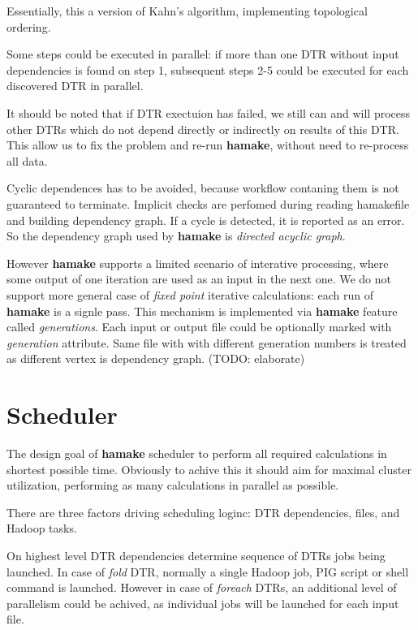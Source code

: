 \documentclass{article}
\begin{document}
Essentially, this a version of Kahn's
algorithm\cite{kahn1962topological}, implementing topological
ordering\cite{wiki:topsort}.

Some steps could be executed in parallel: if more than one DTR without
input dependencies is found on step 1, subsequent steps 2-5 could be
executed for each discovered DTR in parallel.

It should be noted that if DTR exectuion has failed, we still can and
will process other DTRs which do not depend directly or indirectly on
results of this DTR. This allow us to fix the problem and re-run
\textbf{hamake}, without need to re-process all data.

Cyclic dependences has to be avoided, because workflow contaning them
is not guaranteed to terminate. Implicit checks are perfomed during
reading hamakefile and building dependency graph. If a cycle is
detected, it is reported as an error. So the dependency graph used by
\textbf{hamake} is \textit{directed acyclic graph}.

However \textbf{hamake} supports a limited scenario of interative processing,
where some output of one iteration are used as an input in the next
one. We do not support more general case of \textit{fixed point}
iterative calculations: each run of \textbf{hamake} is a signle pass. This
mechanism is implemented via \textbf{hamake} feature called
\textit{generations}. Each input or output file could be optionally
marked with \emph{generation} attribute. Same file with with different
generation numbers is treated as different vertex is dependency
graph. (TODO: elaborate)

\section{Scheduler}

The design goal of \textbf{hamake} scheduler to perform all required
calculations in shortest possible time. Obviously to achive this it
should aim for maximal cluster utilization, performing as many
calculations in parallel as possible.

There are three factors driving scheduling loginc: DTR dependencies,
files, and Hadoop tasks.

On highest level DTR dependencies determine sequence of DTRs jobs
being launched. In case of \emph{fold} DTR, normally a single Hadoop
job, PIG script or shell command is launched. However in case of
\emph{foreach} DTRs, an additional level of parallelism could be
achived, as individual jobs will be launched for each input file.
\end{document}
